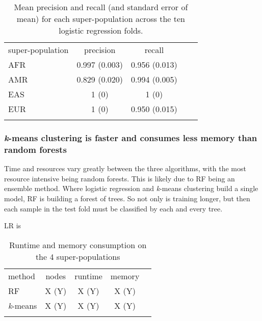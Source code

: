 \documentclass{llncs}
\newcommand{\kMeans}{\textit{k}-means}
\begin{document}
{\begin{table}
\caption{Mean precision and recall (and standard error of mean) for each super-population across the ten logistic regression folds.}
\begin{center}
\renewcommand{\arraystretch}{1.4}
\setlength\tabcolsep{3pt}
\begin{tabular}{lcccc}
\hline\noalign{\smallskip}
super-population  & precision & recall \\
AFR  & 0.997 (0.003) & 0.956 (0.013) \\
AMR & 0.829 (0.020) & 0.994 (0.005) \\
EAS  & 1 (0) & 1 (0) \\
EUR  & 1 (0) & 0.950 (0.015) \\
\noalign{\smallskip}
\hline
\end{tabular}
\end{center}
\end{table}







\subsubsection{\kMeans{} clustering is faster and consumes less memory than random forests}

Time and resources vary greatly between the three algorithms, with the most resource intensive being random forests.
This is likely due to RF being an ensemble method. Where logistic regression and \kMeans{} clustering build a single model,
RF is building a forest of trees. So not only is training longer, but then each sample in the test fold must be classified by each and every tree.

LR is 





\begin{table}
\caption{Runtime and memory consumption on the 4 super-populations}
\begin{center}
\renewcommand{\arraystretch}{1.4}
\setlength\tabcolsep{3pt}
\begin{tabular}{lcccc}
\hline\noalign{\smallskip}
method  & nodes & runtime & memory \\
RF  & X (Y) & X (Y) & X (Y) \\
\kMeans & X (Y) & X (Y) & X (Y) \\
\noalign{\smallskip}
\hline
\end{tabular}
\end{center}
\end{table}




}
\end{document}
